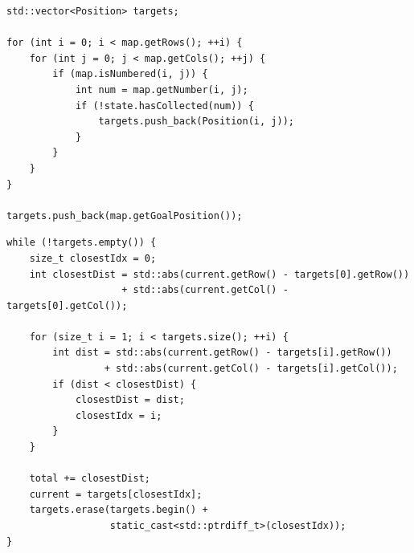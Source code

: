 \begin{tcolorbox}[
	colback=orange!5,
	colframe=orange!70!black,
	title=\textbf{Potongan Implementasi Pengumpulan Target Advanced},
	arc=2mm,
	boxrule=0.8pt
]
\small
\begin{verbatim}
std::vector<Position> targets;

for (int i = 0; i < map.getRows(); ++i) {
    for (int j = 0; j < map.getCols(); ++j) {
        if (map.isNumbered(i, j)) {
            int num = map.getNumber(i, j);
            if (!state.hasCollected(num)) {
                targets.push_back(Position(i, j));
            }
        }
    }
}

targets.push_back(map.getGoalPosition());
\end{verbatim}
\end{tcolorbox}

\begin{tcolorbox}[
	colback=orange!5,
	colframe=orange!70!black,
	title=\textbf{Potongan Implementasi Greedy Nearest Target},
	arc=2mm,
	boxrule=0.8pt
]
\small
\begin{verbatim}
while (!targets.empty()) {
    size_t closestIdx = 0;
    int closestDist = std::abs(current.getRow() - targets[0].getRow())
                    + std::abs(current.getCol() - targets[0].getCol());

    for (size_t i = 1; i < targets.size(); ++i) {
        int dist = std::abs(current.getRow() - targets[i].getRow())
                 + std::abs(current.getCol() - targets[i].getCol());
        if (dist < closestDist) {
            closestDist = dist;
            closestIdx = i;
        }
    }

    total += closestDist;
    current = targets[closestIdx];
    targets.erase(targets.begin() + 
                  static_cast<std::ptrdiff_t>(closestIdx));
}
\end{verbatim}
\end{tcolorbox}

